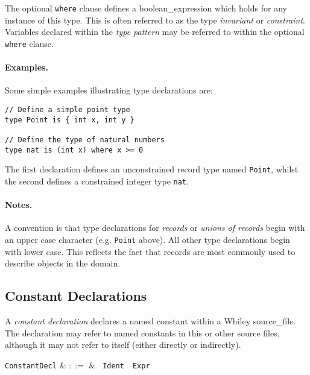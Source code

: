 The optional \lstinline{where} clause defines a
\gls{boolean_expression} which holds for any instance of this type.
This is often referred to as the type {\em invariant} or {\em
  constraint}.  Variables declared within the {\em type pattern} may be
referred to within the optional \lstinline{where} clause.

\paragraph{Examples.}  Some simple examples illustrating type
declarations are:

\begin{lstlisting}
// Define a simple point type
type Point is { int x, int y }

// Define the type of natural numbers
type nat is (int x) where x >= 0
\end{lstlisting}

The first declaration defines an unconstrained record type named
\lstinline{Point}, whilst the second defines a constrained integer
type \lstinline{nat}.

\paragraph{Notes.}  A convention is that type declarations for {\em
  records} or {\em unions of records} begin with an upper case
character (e.g. \lstinline{Point} above).  All other type declarations
begin with lower case.  This reflects the fact that records are most
commonly used to describe objects in the domain.


\subsection{Constant Declarations}
\label{c_source_files_constant_decl}

A {\em constant declaration} declares a named constant within a Whiley \gls{source_file}.  The declaration may refer to named constants in this or other source files, although it may not refer to itself (either directly or indirectly).

\begin{syntax}
  \verb+ConstantDecl+ & $::=$ & \ \verb+Ident+\
  \ \verb+Expr+\\
\end{syntax}

